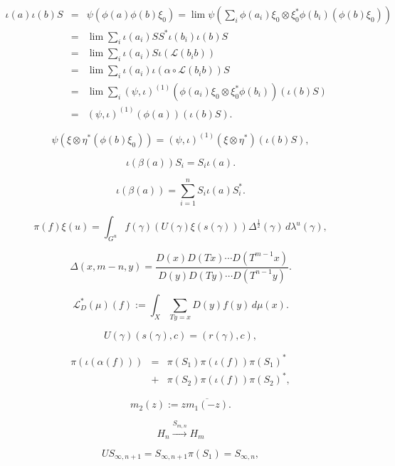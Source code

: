 \documentclass{article}
\begin{document}
\begin{eqnarray}
\iota(a)\iota(b)S & = &
\psi(\phi(a)\phi(b)\xi_{0})=\lim\psi(\sum_{i}\phi(a_{i})\xi_{0}\otimes\xi_{0}^{*
}\phi(b_{i})(\phi(b)\xi_{0}))\label{eq:defining}\\
 & = & \lim\sum_{i}\iota(a_{i})SS^{*}\iota(b_{i})\iota(b)S\nonumber \\
 & = & \lim\sum_{i}\iota(a_{i})S\iota(\mathcal{L}(b_{i}b))\nonumber \\
 & = & \lim\sum_{i}\iota(a_{i})\iota(\alpha\circ\mathcal{L}(b_{i}b))S\nonumber
\\
 & = &
\lim\sum_{i}(\psi,\iota)^{(1)}(\phi(a_{i})\xi_{0}\otimes\xi_{0}^{*}\phi(b_{i}
))(\iota(b)S)\nonumber \\
 & = & (\psi,\iota)^{(1)}(\phi(a))(\iota(b)S).\nonumber \end{eqnarray}

\begin{equation}
\psi(\xi\otimes\eta^{*}(\phi(b)\xi_{0}))=(\psi,\iota)^{(1)}(\xi\otimes\eta^{*}
)(\iota(b)S),\label{eq:definingbis}\end{equation}

\[
\iota(\beta(a))S_{i}=S_{i}\iota(a).\]

\begin{equation}
\iota(\beta(a))=\sum_{i=1}^{n}S_{i}\iota(a)S_{i}^{*}.\label{eq:inner}
\end{equation}

\[
\pi(f)\xi(u)=\int_{G^{u}}f(\gamma)(U(\gamma)\xi(s(\gamma)))\Delta^{\frac{1}{2}}
(\gamma)\, d\lambda^{u}(\gamma),\]

\[
\Delta(x,m-n,y)=\frac{D(x)D(Tx)\cdots D(T^{m-1}x)}{D(y)D(Ty)\cdots
D(T^{n-1}y)}.\]

\begin{equation}
\mathcal{L}_{D}^{*}(\mu)(f):=\int_{X}\sum_{Ty=x}D(y)f(y)\,
d\mu(x).\label{eq:Transfer}\end{equation}

\[
U(\gamma)(s(\gamma),c)=(r(\gamma),c),\]

\begin{eqnarray*}
\pi(\iota(\alpha(f))) & = & \pi(S_{1})\pi(\iota(f))\pi(S_{1})^{*}\\
 & + & \pi(S_{2})\pi(\iota(f))\pi(S_{2})^{*},\end{eqnarray*}

\[
m_{2}(z):=z\overline{m_{1}(-z)}.\]

\[
H_{n}\stackrel{S_{m,n}}{\longrightarrow}H_{m}\]

\[
US_{\infty,n+1}=S_{\infty,n+1}\pi(S_{1})=S_{\infty,n},\]
\end{document}
